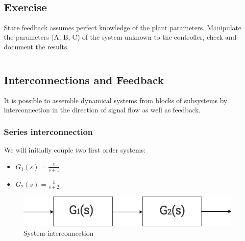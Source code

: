 \documentclass[11pt,a4paper, d]{scrartcl}
\makeatletter
\providecommand{\tightlist}{%
      \setlength{\itemsep}{0pt}\setlength{\parskip}{0pt}}
\newcommand{\boxspacing}{\kern\kvtcb@left@rule\kern\kvtcb@boxsep}
\newcommand{\prompt}[4]{
        {\ttfamily\llap{{\color{#2}[#3]:\hspace{3pt}#4}}\vspace{-\baselineskip}}
    }
\makeatother
\begin{document}
    \begin{center}
    \end{center}
    { \hspace*{\fill} \\}
    
    \hypertarget{exercise}{%
\subsection{Exercise}\label{exercise}}

State feedback assumes perfect knowledge of the plant parameters.
Manipulate the parameters (A, B, C) of the system unknown to the
controller, check and document the results.

    \begin{tcolorbox}[breakable, size=fbox, boxrule=1pt, pad at break*=1mm,colback=cellbackground, colframe=cellborder]
\prompt{In}{incolor}{ }{\boxspacing}
\begin{Verbatim}[commandchars=\\\{\}]

\end{Verbatim}
\end{tcolorbox}

    \hypertarget{interconnections-and-feedback}{%
\subsection{Interconnections and
Feedback}\label{interconnections-and-feedback}}

It is possible to assemble dynamical systems from blocks of subsystems
by interconnection in the direction of signal flow as well as feedback.

\hypertarget{series-interconnection}{%
\subsubsection{Series interconnection}\label{series-interconnection}}

We will initially couple two first order systems:

\begin{itemize}
\tightlist
\item
  \(G_1(s) = \frac{1}{s+1}\)
\item
  \(G_2(s) = \frac{1}{s+2}\)
\end{itemize}

\begin{figure}
\centering
\includegraphics{figures/Interconnection.png}
\caption{System interconnection}
\end{figure}
\end{document}
